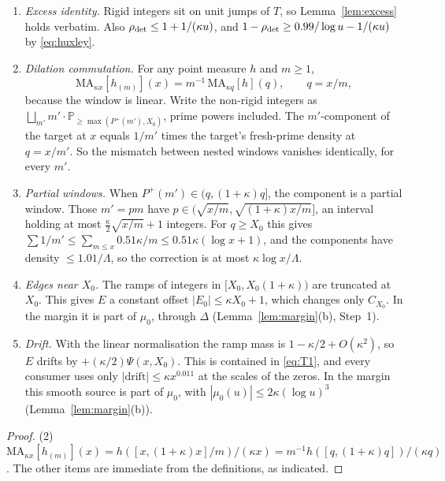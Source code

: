 \begin{lemma}\label{lem:blin}
\leavevmode
\begin{enumerate}[label=(\arabic*)]
\item \emph{Excess identity.} Rigid integers sit on unit jumps of $T$, so Lemma~\ref{lem:excess} holds verbatim. Also
$\rho_{\mathrm{det}}\le1+1/(\kappa u)$, and $1-\rho_{\mathrm{det}}\ge0.99/\log u-1/(\kappa u)$ by \eqref{eq:huxley}.
\item \emph{Dilation commutation.} For any point measure $h$ and $m\ge1$,
\[
  \mathrm{MA}_{\kappa x}[h_{(m)}](x)=m^{-1}\,\mathrm{MA}_{\kappa q}[h](q),\qquad q=x/m,
\]
because the window is linear. Write the non-rigid integers as $\bigsqcup_{m'}m'\cdot\mathbb P_{\ge\max(P^+(m'),X_0)}$, prime powers
included. The $m'$-component of the target at $x$ equals $1/m'$ times the target's fresh-prime density at $q=x/m'$. So the
mismatch between nested windows vanishes identically, for every $m'$.
\item \emph{Partial windows.} When $P^+(m')\in(q,(1+\kappa)q]$, the component is a partial window. Those $m'=pm$ have
$p\in(\sqrt{x/m},\sqrt{(1+\kappa)x/m}]$, an interval holding at most $\frac\kappa2\sqrt{x/m}+1$ integers. For $q\ge X_0$ this gives
$\sum1/m'\le\sum_{m\le x}0.51\kappa/m\le0.51\kappa(\log x+1)$, and the components have density $\le1.01/\Lambda$, so the correction is
at most $\kappa\log x/\Lambda$.
\item \emph{Edges near $X_0$.} The ramps of integers in $[X_0,X_0(1+\kappa))$ are truncated at $X_0$. This gives $E$ a constant offset
$|E_0|\le\kappa X_0+1$, which changes only $C_{X_0}$. In the margin it is part of $\mu_0$, through $\Delta$ (Lemma~\ref{lem:margin}(b),
Step~1).
\item \emph{Drift.} With the linear normalisation the ramp mass is $1-\kappa/2+O(\kappa^2)$, so $E$ drifts by
$+(\kappa/2)\Psi(x,X_0)$. This is contained in \eqref{eq:T1}, and every consumer uses only $|\text{drift}|\le\kappa x^{0.011}$ at the
scales of the zeros. In the margin this smooth source is part of $\mu_0$, with $|\mu_0(u)|\le2\kappa(\log u)^3$
(Lemma~\ref{lem:margin}(b)).
\end{enumerate}
\end{lemma}
\begin{proof}
(2) $\mathrm{MA}_{\kappa x}[h_{(m)}](x)=h([x,(1+\kappa)x]/m)/(\kappa x)=m^{-1}h([q,(1+\kappa)q])/(\kappa q)$. The other items are immediate
from the definitions, as indicated.
\end{proof}

